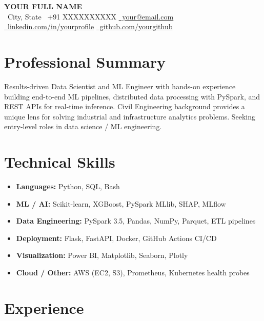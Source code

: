 \documentclass[10pt, letterpaper]{article}
\begin{document}
\begin{center}
  {\LARGE\bfseries YOUR FULL NAME}\\[4pt]
  {\small
    \faMapMarker\ City, State
    \quad\textbar\quad
    \faPhone\ +91 XXXXXXXXXX
    \quad\textbar\quad
    \href{mailto:your@email.com}{\faEnvelope\ your@email.com}
    \quad\textbar\quad
    \href{https://linkedin.com/in/yourprofile}{\faLinkedin\ linkedin.com/in/yourprofile}
    \quad\textbar\quad
    \href{https://github.com/yourgithub}{\faGithub\ github.com/yourgithub}
  }
\end{center}

\section{Professional Summary}
Results-driven Data Scientist and ML Engineer with hands-on experience building
end-to-end ML pipelines, distributed data processing with PySpark, and REST APIs
for real-time inference. Civil Engineering background provides a unique lens for
solving industrial and infrastructure analytics problems. Seeking entry-level
roles in data science / ML engineering.

\section{Technical Skills}
\begin{itemize}[leftmargin=0pt, label={}]
  \item \textbf{Languages:}        Python, SQL, Bash
  \item \textbf{ML / AI:}          Scikit-learn, XGBoost, PySpark MLlib, SHAP, MLflow
  \item \textbf{Data Engineering:} PySpark 3.5, Pandas, NumPy, Parquet, ETL pipelines
  \item \textbf{Deployment:}       Flask, FastAPI, Docker, GitHub Actions CI/CD
  \item \textbf{Visualization:}    Power BI, Matplotlib, Seaborn, Plotly
  \item \textbf{Cloud / Other:}    AWS (EC2, S3), Prometheus, Kubernetes health probes
\end{itemize}

\section{Experience}
\end{document}
